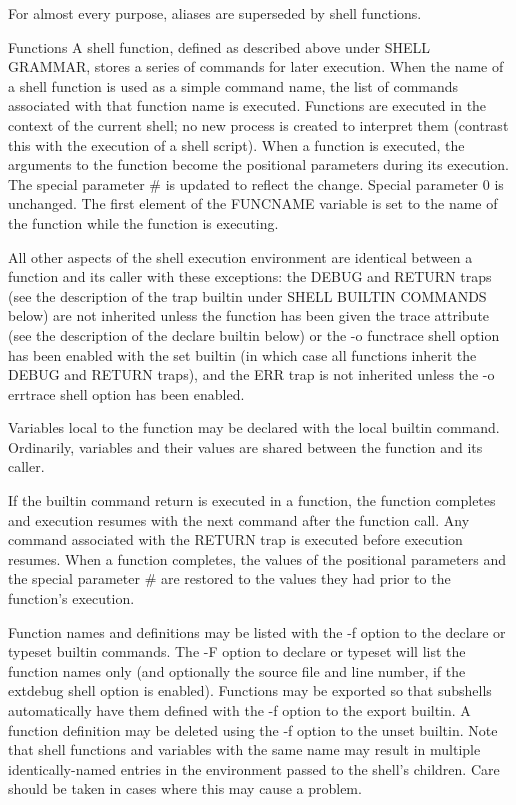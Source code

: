 \documentclass[11pt]{article}
\begin{document}
{{{For almost every purpose, aliases are superseded by shell functions.

Functions
A shell function, defined as described above under SHELL GRAMMAR, stores a series of commands for later execution. When the name of a shell function is used as a simple command name, the list of commands associated with that function name is executed. Functions are executed in the context of the current shell; no new process is created to interpret them (contrast this with the execution of a shell script). When a function is executed, the arguments to the function become the positional parameters during its execution. The special parameter # is updated to reflect the change. Special parameter 0 is unchanged. The first element of the FUNCNAME variable is set to the name of the function while the function is executing.

All other aspects of the shell execution environment are identical between a function and its caller with these exceptions: the DEBUG and RETURN traps (see the description of the trap builtin under SHELL BUILTIN COMMANDS below) are not inherited unless the function has been given the trace attribute (see the description of the declare builtin below) or the -o functrace shell option has been enabled with the set builtin (in which case all functions inherit the DEBUG and RETURN traps), and the ERR trap is not inherited unless the -o errtrace shell option has been enabled.

Variables local to the function may be declared with the local builtin command. Ordinarily, variables and their values are shared between the function and its caller.

If the builtin command return is executed in a function, the function completes and execution resumes with the next command after the function call. Any command associated with the RETURN trap is executed before execution resumes. When a function completes, the values of the positional parameters and the special parameter # are restored to the values they had prior to the function's execution.

Function names and definitions may be listed with the -f option to the declare or typeset builtin commands. The -F option to declare or typeset will list the function names only (and optionally the source file and line number, if the extdebug shell option is enabled). Functions may be exported so that subshells automatically have them defined with the -f option to the export builtin. A function definition may be deleted using the -f option to the unset builtin. Note that shell functions and variables with the same name may result in multiple identically-named entries in the environment passed to the shell's children. Care should be taken in cases where this may cause a problem.

}}}
\end{document}
